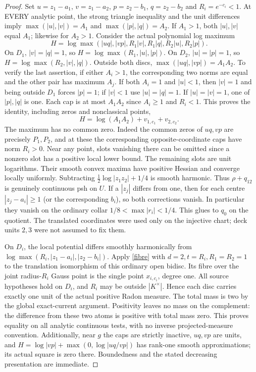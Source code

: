 \documentclass[11pt]{article}
\begin{document}
\begin{proof}
Set $u=z_1-a_1$, $v=z_1-a_2$, $p=z_2-b_1$, $q=z_2-b_2$ and
$R_i=e^{-c_i}<1$. At EVERY analytic point, the strong triangle inequality
and the unit differences imply
$\max(|u|,|v|)=A_1$ and $\max(|p|,|q|)=A_2$.
If $A_1>1$, both $|u|,|v|$ equal $A_1$; likewise for $A_2>1$.
Consider the actual polynomial log maximum
\[
 H=\log\max(|uq|,|vp|,R_1|v|,R_1|q|,R_2|u|,R_2|p|).
\]
On $D_1$, $|v|=|q|=1$, so $H=\log\max(R_1,|u|,|p|)$.
On $D_2$, $|u|=|p|=1$, so $H=\log\max(R_2,|v|,|q|)$.
Outside both discs, $\max(|uq|,|vp|)=A_1A_2$.
To verify the last assertion, if either $A_i>1$, the corresponding two
norms are equal and the other pair has maximum $A_j$. If both $A_i=1$
and $|u|<1$, then $|v|=1$ and being outside $D_1$ forces $|p|=1$;
if $|v|<1$ use $|u|=|q|=1$. If $|u|=|v|=1$, one of $|p|,|q|$ is one.
Each cap is at most $A_1A_2$ since $A_i\ge1$ and $R_i<1$.
This proves the identity, including zeros and nonclassical points,
\[
 H=\log(A_1A_2)+v_{1,c_1}+v_{2,c_2}.
\]
The maximum has no common zero. Indeed the common zeros of $uq,vp$
are precisely $P_1,P_2$, and at these the corresponding opposite-coordinate
caps have norm $R_i>0$. Near any point, slots vanishing there can be
omitted since a nonzero slot has a positive local lower bound. The remaining
slots are unit logarithms. Their smooth convex maxima have positive
Hessian and converge locally uniformly. Subtracting
$\tfrac12\log|z_1z_2|+1/4$ is smooth harmonic. Thus $\rho+q_{12}$
is genuinely continuous psh on $U$.
If a $|z_j|$ differs from one, then for each centre
$|z_j-a_i|\ge1$ (or the corresponding $b_i$), so both corrections vanish.
In particular they vanish on the ordinary collar
$1/8<\max|r_i|<1/4$. This glues to $q_0$ on the quotient. The translated
coordinates were used only on the injective chart; deck units $2,3$ were
not assumed to fix them.

On $D_i$, the local potential differs smoothly harmonically from
$\log\max(R_i,|z_1-a_i|,|z_2-b_i|)$. Apply \eqref{fibre} with
$d=2,t=R_i,R_1=R_2=1$ to the translation isomorphism of this ordinary
open bidisc. Its fibre over the joint radius-$R_i$ Gauss point is the
single point $x_{i,c_i}$, degree one. All source hypotheses hold on
$D_i$, and $R_i$ may be outside $|K^\times|$.
Hence each disc carries exactly one unit of the actual positive Radon
measure. The total mass is two by the global exact-current argument.
Positivity leaves no mass on the complement: the difference from these
two atoms is positive with total mass zero. This proves equality on all
analytic continuous tests, with no inverse projected-measure convention.
Additionally, near $g$ the caps are strictly inactive, $uq,vp$ are units,
and $H=\log|vp|+\max(0,\log|uq/vp|)$ has rank-one smooth approximations;
its actual square is zero there. Boundedness and the stated decreasing
presentation are immediate.
\end{proof}
\end{document}
